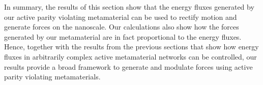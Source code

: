\documentclass[
 preprint,
 preprintnumbers,
 amsmath,amssymb,
 aps,
 pre,
 longbibliography,
 superscriptaddress,
 10pt, twocolumn
]{revtex4-1}
\begin{document}

In summary, the results of this section show that the energy fluxes generated by our active parity violating metamaterial can be used to rectify motion and generate forces on the nanoscale. Our calculations also show how the forces generated by our metamaterial are in fact proportional to the energy fluxes. Hence, together with the results from the previous sections that show how energy fluxes in arbitrarily complex active metamaterial networks can be controlled, our results provide a broad framework to generate and modulate forces using active parity violating metamaterials.  




\end{document}
